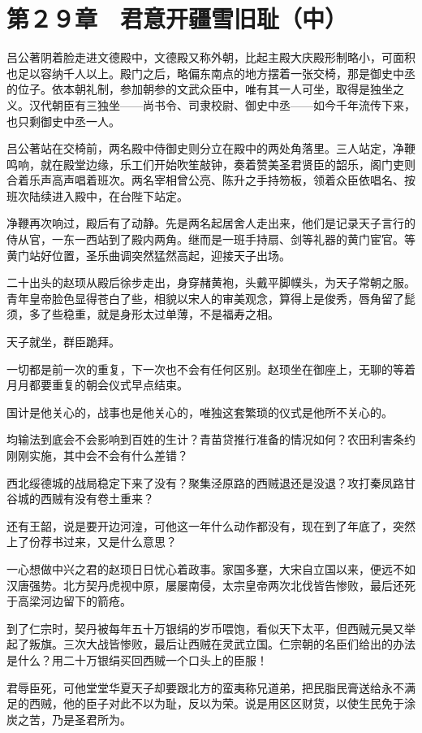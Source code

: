 \section{第２９章　君意开疆雪旧耻（中）}

吕公著阴着脸走进文德殿中，文德殿又称外朝，比起主殿大庆殿形制略小，可面积也足以容纳千人以上。殿门之后，略偏东南点的地方摆着一张交椅，那是御史中丞的位子。依本朝礼制，参加朝参的文武众臣中，唯有其一人可坐，取得是独坐之义。汉代朝臣有三独坐——尚书令、司隶校尉、御史中丞——如今千年流传下来，也只剩御史中丞一人。

吕公著站在交椅前，两名殿中侍御史则分立在殿中的两处角落里。三人站定，净鞭鸣响，就在殿堂边缘，乐工们开始吹笙敲钟，奏着赞美圣君贤臣的韶乐，阁门吏则合着乐声高声唱着班次。两名宰相曾公亮、陈升之手持笏板，领着众臣依唱名、按班次陆续进入殿中，在台陛下站定。

净鞭再次响过，殿后有了动静。先是两名起居舍人走出来，他们是记录天子言行的侍从官，一东一西站到了殿内两角。继而是一班手持扇、剑等礼器的黄门宦官。等黄门站好位置，圣乐曲调突然猛然高起，迎接天子出场。

二十出头的赵顼从殿后徐步走出，身穿赭黄袍，头戴平脚幞头，为天子常朝之服。青年皇帝脸色显得苍白了些，相貌以宋人的审美观念，算得上是俊秀，唇角留了髭须，多了些稳重，就是身形太过单薄，不是福寿之相。

天子就坐，群臣跪拜。

一切都是前一次的重复，下一次也不会有任何区别。赵顼坐在御座上，无聊的等着月月都要重复的朝会仪式早点结束。

国计是他关心的，战事也是他关心的，唯独这套繁琐的仪式是他所不关心的。

均输法到底会不会影响到百姓的生计？青苗贷推行准备的情况如何？农田利害条约刚刚实施，其中会不会有什么差错？

西北绥德城的战局稳定下来了没有？聚集泾原路的西贼退还是没退？攻打秦凤路甘谷城的西贼有没有卷土重来？

还有王韶，说是要开边河湟，可他这一年什么动作都没有，现在到了年底了，突然上了份荐书过来，又是什么意思？

一心想做中兴之君的赵顼日日忧心着政事。家国多蹇，大宋自立国以来，便远不如汉唐强势。北方契丹虎视中原，屡屡南侵，太宗皇帝两次北伐皆告惨败，最后还死于高梁河边留下的箭疮。

到了仁宗时，契丹被每年五十万银绢的岁币喂饱，看似天下太平，但西贼元昊又举起了叛旗。三次大战皆惨败，最后让西贼在灵武立国。仁宗朝的名臣们给出的办法是什么？用二十万银绢买回西贼一个口头上的臣服！

君辱臣死，可他堂堂华夏天子却要跟北方的蛮夷称兄道弟，把民脂民膏送给永不满足的西贼，他的臣子对此不以为耻，反以为荣。说是用区区财货，以使生民免于涂炭之苦，乃是圣君所为。

